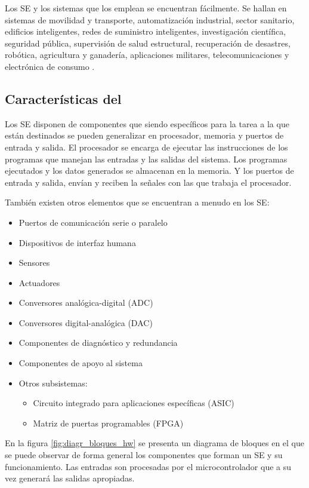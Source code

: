 Los SE y los sistemas que los emplean se encuentran fácilmente. Se hallan en 
sistemas de movilidad y transporte, automatización industrial, sector sanitario,
edificios inteligentes, redes de suministro inteligentes, investigación
científica, seguridad pública, supervisión de salud estructural, recuperación de
desastres, robótica, agricultura y ganadería, aplicaciones militares,
telecomunicaciones y electrónica de consumo \cite{marwedel2018}.

\subsection{Características del }
Los SE disponen de componentes  que siendo específicos
para la tarea a la que están destinados se pueden generalizar en procesador,
memoria y puertos de entrada y salida. El procesador se encarga de ejecutar las
instrucciones de los programas que manejan las entradas y las salidas del
sistema. Los programas ejecutados y los datos generados se almacenan en la
memoria. Y los puertos de entrada y salida, envían y reciben la señales con las
que trabaja el procesador.\cite{jimenez2014}

También existen otros elementos que se encuentran a menudo en los SE:
\begin{itemize}
    \item Puertos de comunicación serie o paralelo
    \item Dispositivos de interfaz humana
    \item Sensores
    \item Actuadores
    \item Conversores analógica-digital (ADC)
    \item Conversores digital-analógica (DAC)
    \item Componentes de diagnóstico y redundancia
    \item Componentes de apoyo al sistema
    \item Otros subsistemas:
    \begin{itemize}
        \item Circuito integrado para aplicaciones específicas (ASIC)
        \item Matriz de puertas programables (FPGA)
    \end{itemize}
\end{itemize}

En la figura \ref{fig:diagr_bloques_hw} se presenta un diagrama de bloques
en el que se puede observar de forma general los componentes que forman un SE
y su funcionamiento. Las entradas son procesadas por el microcontrolador que a
su vez generará las salidas apropiadas. 

